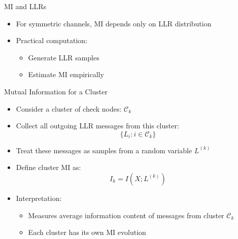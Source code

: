 \documentclass{beamer}
\begin{document}
\begin{frame}{MI and LLRs}
\begin{itemize}
    \item For symmetric channels, MI depends only on LLR distribution
    \item Practical computation:
    \begin{itemize}
        \item Generate LLR samples
        \item Estimate MI empirically
    \end{itemize}
\end{itemize}
\end{frame}

\begin{frame}{Mutual Information for a Cluster}
\begin{itemize}
    \item Consider a cluster of check nodes: $\mathcal{C}_k$
    \item Collect all outgoing LLR messages from this cluster:
    \[
    \{L_i : i \in \mathcal{C}_k\}
    \]

    \item Treat these messages as samples from a random variable $L^{(k)}$

    \item Define cluster MI as:
    \[
    I_k = I(X; L^{(k)})
    \]

    \item Interpretation:
    \begin{itemize}
        \item Measures average information content of messages from cluster $\mathcal{C}_k$
        \item Each cluster has its own MI evolution
    \end{itemize}
\end{itemize}
\end{frame}
\end{document}
